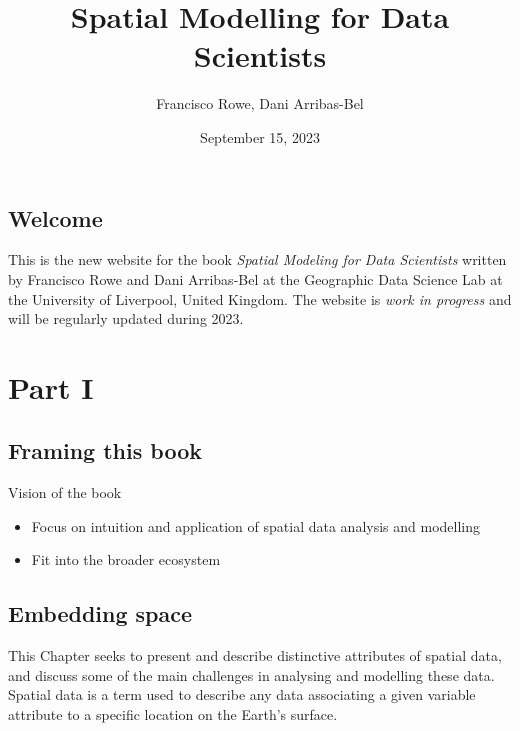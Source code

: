 \documentclass[
  letterpaper,
  krantz2]{style/krantz}
\title{Spatial Modelling for Data Scientists}
\author{Francisco Rowe, Dani Arribas-Bel}
\date{September 15, 2023}
\begin{document}
\maketitle
\ifdefined\Shaded\renewenvironment{Shaded}{\begin{tcolorbox}[colback={shadecolor}, frame hidden, breakable, boxrule=0pt, enhanced]}{\end{tcolorbox}}\fi


\hypertarget{welcome}{%
\chapter*{Welcome}\label{welcome}}


This is the new website for the book \emph{Spatial Modeling for Data
Scientists} written by Francisco Rowe and Dani Arribas-Bel at the
Geographic Data Science Lab at the University of Liverpool, United
Kingdom. The website is \emph{work in progress} and will be regularly
updated during 2023.

\part{Part I}

\hypertarget{framing-this-book}{%
\chapter{Framing this book}\label{framing-this-book}}

Vision of the book

\begin{itemize}
\item
  Focus on intuition and application of spatial data analysis and
  modelling
\item
  Fit into the broader ecosystem
\end{itemize}

\hypertarget{embedding-space}{%
\chapter{Embedding space}\label{embedding-space}}

This Chapter seeks to present and describe distinctive attributes of
spatial data, and discuss some of the main challenges in analysing and
modelling these data. Spatial data is a term used to describe any data
associating a given variable attribute to a specific location on the
Earth's surface.
\end{document}
